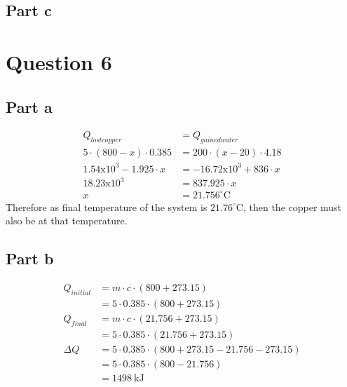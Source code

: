 \subsection{Part c}

\section{Question 6}
\subsection{Part a}
\begin{equation*}
    \begin{split}
        Q_{lost copper} & = Q_{gained water} \\
        5 \cdot (800 - x) \cdot 0.385 & = 200 \cdot (x - 20) \cdot 4.18 \\
        1.54\text{x}10^3 - 1.925 \cdot x & = -16.72\text{x}10^3 + 836 \cdot x \\
        18.23\text{x}10^3 & = 837.925 \cdot x \\
        x & = 21.756^\circ \text{C}
    \end{split}
\end{equation*}
Therefore as final temperature of the system is $21.76^\circ \text{C}$, then the copper must also be at that temperature.

\subsection{Part b}
\begin{equation*}
    \begin{split}
        Q_{initial} & = m \cdot c \cdot (800 + 273.15) \\
        & = 5 \cdot 0.385 \cdot (800 + 273.15) \\
        Q_{final} & = m \cdot c \cdot (21.756 + 273.15) \\
        & = 5 \cdot 0.385 \cdot (21.756 + 273.15) \\
        \Delta Q & = 5 \cdot 0.385 \cdot (800 + 273.15 - 21.756 - 273.15) \\
        & = 5 \cdot 0.385 \cdot (800 - 21.756) \\
        & = \SI{1498}{\kilo\joule}
    \end{split}
\end{equation*}